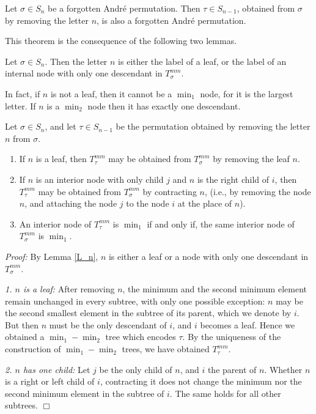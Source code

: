 \begin{theorem}
\label{T_del}
Let $\sigma\in S_n$ be a forgotten Andr\'e permutation. Then $\tau\in
S_{n-1}$, obtained from $\sigma$ by removing the letter $n$, is also a
forgotten Andr\'e permutation.
\end{theorem}  

This theorem is the consequence of the following two lemmas.

\begin{lemma}
\label{L_n}
Let $\sigma\in S_n$. Then the letter $n$ is either the label of a leaf,
or the label of an internal node with only one descendant in
$T_{\sigma}^{mm}$.  
\end{lemma}
In fact, if $n$ is not a leaf, then it cannot be a $\min_1$ node, for it
is the largest letter. If $n$ is a $\min_2$ node then it has exactly one
descendant.  

\begin{lemma}
\label{L_del}
Let $\sigma\in S_n$, and let $\tau\in S_{n-1}$ be the permutation obtained
by removing the letter $n$ from $\sigma$. 
\begin{enumerate}
\item If $n$ is a leaf, then $T_{\tau}^{mm}$ may be obtained from
$T_{\sigma}^{mm}$ by removing the leaf $n$. 
\item If $n$ is an interior node with only child $j$ and $n$ is the right
child of $i$, then $T_{\tau}^{mm}$ may be obtained from $T_{\sigma}^{mm}$ by
contracting $n$, (i.e., by removing the node $n$, and attaching the node
$j$ to the node $i$ at the place of $n$). 
\item An interior node of $T_{\tau}^{mm}$ is $\min_1$ if and only if,
the same interior node of $T_{\sigma}^{mm}$ is $\min_1$.
\end{enumerate}
\end{lemma}
{\em Proof: }
By Lemma \ref{L_n}, $n$ is either a leaf or a node with only one
descendant in $T_{\sigma}^{mm}$. 
\begin{description}
\item{{\em 1. $n$ is a leaf:}} After removing $n$,
the minimum and the second minimum element remain unchanged in every subtree,
with only one possible exception: $n$ may be the second smallest
element in the subtree of its parent, which we denote by $i$. But then $n$
must be the only descendant of $i$, and $i$ becomes a leaf. Hence we obtained a
$\min_1-\min_2$ tree which encodes $\tau$. By the uniqueness of the
construction of $\min_1-\min_2$ trees, we have obtained
$T_{\tau}^{mm}$.
\item{{\em 2. $n$ has one child:}} Let $j$ be the only child of $n$, and
$i$ the parent of $n$. Whether $n$ is a right or left child of $i$,
contracting it does not change the minimum nor the second minimum
element in the subtree of $i$. The same holds for all other subtrees.
\hfill$\Box$
\end{description}

